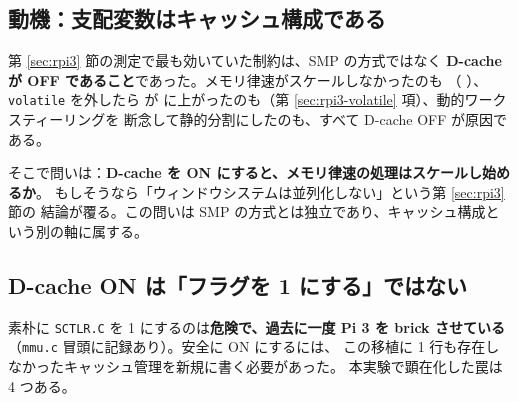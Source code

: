 %
%

\subsection{動機：支配変数はキャッシュ構成である}

第 \ref{sec:rpi3} 節の測定で最も効いていた制約は、SMP の方式ではなく
\textbf{D-cache が OFF であること}であった。メモリ律速がスケールしなかったのも
（ ）、\texttt{volatile} を外したら  が
 に上がったのも（第 \ref{sec:rpi3-volatile} 項）、動的ワークスティーリングを
断念して静的分割にしたのも、すべて D-cache OFF が原因である。

そこで問いは：\textbf{D-cache を ON にすると、メモリ律速の処理はスケールし始めるか}。
もしそうなら「ウィンドウシステムは並列化しない」という第 \ref{sec:rpi3}\,節の
結論が覆る。この問いは SMP の方式とは独立であり、キャッシュ構成という別の軸に属する。

\subsection{D-cache ON は「フラグを 1 にする」ではない}

素朴に \texttt{SCTLR.C} を 1 にするのは\textbf{危険で、過去に一度 Pi 3 を
brick させている}（\texttt{mmu.c} 冒頭に記録あり）。安全に ON にするには、
この移植に 1 行も存在しなかったキャッシュ管理を新規に書く必要があった。
本実験で顕在化した罠は 4 つある。

